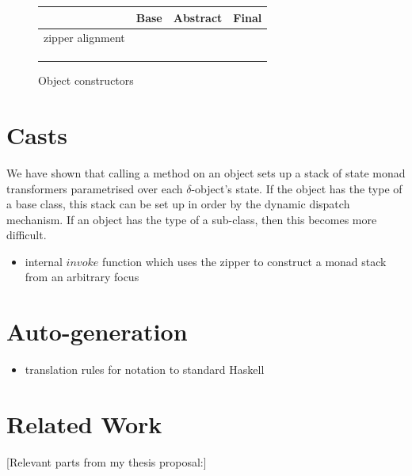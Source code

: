 \documentclass[runningheads,a4paper]{llncs}
\newcommand{\todo}[1]{[{\color{blue}#1}]}
\begin{document}
\begin{figure}
\begin{center}
\begin{tabular}{|c|c|c|c|}
\hline  & Base & Abstract & Final \\ 
\hline zipper alignment &  &  &  \\ 
\hline  &  &  &  \\ 
\hline  &  &  &  \\ 
\hline  &  &  &  \\ 
\hline 
\end{tabular} 
\end{center}

\caption{Object constructors}\label{tab:constructors}
\end{figure}

\section{Casts}
\label{sec:casts}

We have shown that calling a method on an object sets up a stack of state monad transformers parametrised over each $\delta$-object's state. If the object has the type of a base class, this stack can be set up in order by the dynamic dispatch mechanism. If an object has the type of a sub-class, then this becomes more difficult.



\begin{itemize}
\item internal $\mathit{invoke}$ function which uses the zipper to construct a monad stack from an arbitrary focus
\end{itemize}

\section{Auto-generation}
\label{sec:auto}

\begin{itemize}
\item translation rules for notation to standard Haskell
\end{itemize}

\section{Related Work}
\label{sec:related}

\todo{Relevant parts from my thesis proposal:}

\end{document}
